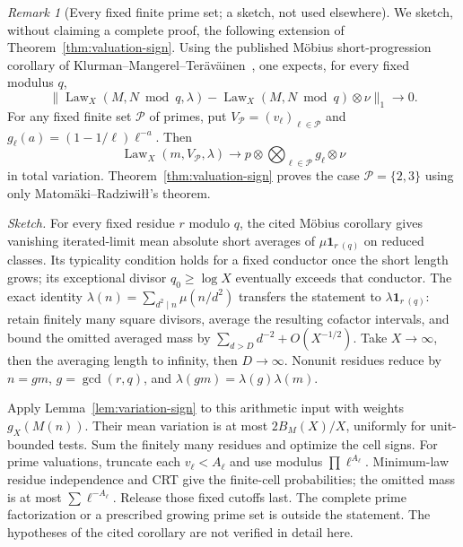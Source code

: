 \documentclass[11pt]{amsart}
\theoremstyle{definition}
\theoremstyle{remark}
\newtheorem{remark}[theorem]{Remark}
\newcommand{\one}{\mathbf 1}
\begin{document}
\begin{remark}[Every fixed finite prime set; a sketch, not used elsewhere]\label{cor:prime-sign}
We sketch, without claiming a complete proof, the following extension of Theorem~\ref{thm:valuation-sign}. Using the published M\"obius short-progression corollary of Klurman--Mangerel--Ter\"av\"ainen~\cite{KMT2023}, one expects, for every fixed modulus $q$,
\[
 \|\operatorname{Law}_X(M,N\bmod q,\lambda)
       -\operatorname{Law}_X(M,N\bmod q)\otimes\nu\|_1\to0.
\]
For any fixed finite set $\mathcal P$ of primes, put $V_{\mathcal P}=(v_\ell)_{\ell\in\mathcal P}$ and $g_\ell(a)=(1-1/\ell)\ell^{-a}$. Then
\[
 \operatorname{Law}_X(m,V_{\mathcal P},\lambda)
       \longrightarrow p\otimes\bigotimes_{\ell\in\mathcal P}g_\ell\otimes\nu
\]
in total variation. Theorem~\ref{thm:valuation-sign} proves the case $\mathcal P=\{2,3\}$ using only Matom\"aki--Radziwi\l\l's theorem.

\emph{Sketch.} For every fixed residue $r$ modulo $q$, the cited M\"obius corollary gives vanishing iterated-limit mean absolute short averages of $\mu\one_{r\ (q)}$ on reduced classes. Its typicality condition holds for a fixed conductor once the short length grows; its exceptional divisor $q_0\ge\log X$ eventually exceeds that conductor. The exact identity $\lambda(n)=\sum_{d^2\mid n}\mu(n/d^2)$ transfers the statement to $\lambda\one_{r\ (q)}$: retain finitely many square divisors, average the resulting cofactor intervals, and bound the omitted averaged mass by $\sum_{d>D}d^{-2}+O(X^{-1/2})$. Take $X\to\infty$, then the averaging length to infinity, then $D\to\infty$. Nonunit residues reduce by $n=gm$, $g=\gcd(r,q)$, and $\lambda(gm)=\lambda(g)\lambda(m)$.

Apply Lemma~\ref{lem:variation-sign} to this arithmetic input with weights $g_X(M(n))$. Their mean variation is at most $2B_M(X)/X$, uniformly for unit-bounded tests. Sum the finitely many residues and optimize the cell signs. For prime valuations, truncate each $v_\ell<A_\ell$ and use modulus $\prod\ell^{A_\ell}$. Minimum-law residue independence \cite[Theorem~3]{BM} and CRT give the finite-cell probabilities; the omitted mass is at most $\sum\ell^{-A_\ell}$. Release those fixed cutoffs last. The complete prime factorization or a prescribed growing prime set is outside the statement. The hypotheses of the cited corollary are not verified in detail here.
\end{remark}
\end{document}
